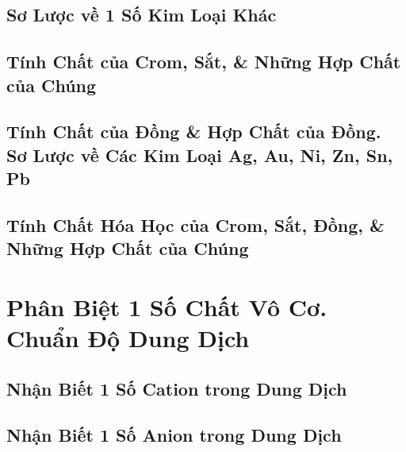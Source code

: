 \documentclass{article}
\numberwithin{equation}{section}
\begin{document}

\subsection{Sơ Lược về 1 Số Kim Loại Khác}


\subsection{Tính Chất của Crom, Sắt, \& Những Hợp Chất của Chúng}


\subsection{Tính Chất của Đồng \& Hợp Chất của Đồng. Sơ Lược về Các Kim Loại Ag, Au, Ni, Zn, Sn, Pb}


\subsection{Tính Chất Hóa Học của Crom, Sắt, Đồng, \& Những Hợp Chất của Chúng}


\section{Phân Biệt 1 Số Chất Vô Cơ. Chuẩn Độ Dung Dịch}

\subsection{Nhận Biết 1 Số Cation trong Dung Dịch}


\subsection{Nhận Biết 1 Số Anion trong Dung Dịch}

\end{document}
